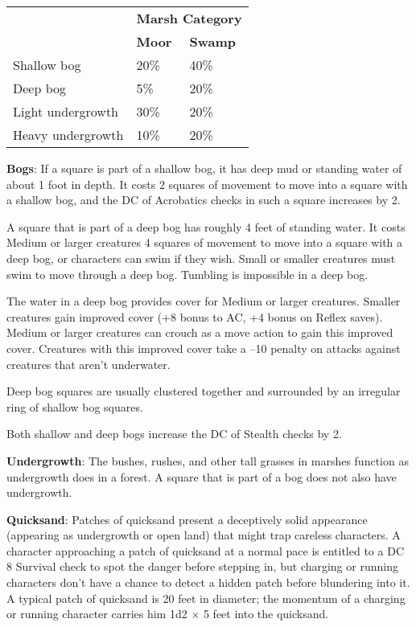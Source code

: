 \begin{tabular}{lll}
 & \multicolumn{2}{c}{\textbf{Marsh Category}} \\
 & \textbf{Moor} & \textbf{Swamp} \\
Shallow bog & 20\% & 40\% \\
Deep bog & 5\% & 20\%\\
Light undergrowth & 30\% & 20\%\\
Heavy undergrowth & 10\% & 20\%\\
\end{tabular}
				
\textbf{Bogs}: If a square is part of a shallow bog, it has deep mud or standing water of about 1 foot in depth. It costs 2 squares of movement to move into a square with a shallow bog, and the DC of Acrobatics checks in such a square increases by 2. 
				
A square that is part of a deep bog has roughly 4 feet of standing water. It costs Medium or larger creatures 4 squares of movement to move into a square with a deep bog, or characters can swim if they wish. Small or smaller creatures must swim to move through a deep bog. Tumbling is impossible in a deep bog.
				
The water in a deep bog provides cover for Medium or larger creatures. Smaller creatures gain improved cover (+8 bonus to AC, +4 bonus on Reflex saves). Medium or larger creatures can crouch as a move action to gain this improved cover. Creatures with this improved cover take a --10 penalty on attacks against creatures that aren't underwater.
				
Deep bog squares are usually clustered together and surrounded by an irregular ring of shallow bog squares.
				
Both shallow and deep bogs increase the DC of Stealth checks by 2.
				
\textbf{Undergrowth}: The bushes, rushes, and other tall grasses in marshes function as undergrowth does in a forest. A square that is part of a bog does not also have undergrowth. 
				
\textbf{Quicksand}: Patches of quicksand present a deceptively solid appearance (appearing as undergrowth or open land) that might trap careless characters. A character approaching a patch of quicksand at a normal pace is entitled to a DC 8 Survival check to spot the danger before stepping in, but charging or running characters don't have a chance to detect a hidden patch before blundering into it. A typical patch of quicksand is 20 feet in diameter; the momentum of a charging or running character carries him 1d2 \mbox{$\times$} 5 feet into the quicksand.
				
